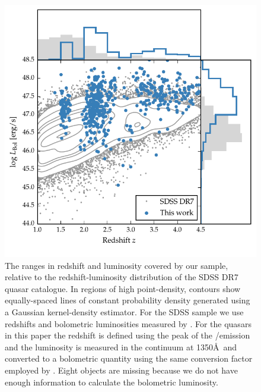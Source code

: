 \begin{figure}
    \includegraphics[width=\textwidth]{figures/chapter02/luminosity_z.pdf} 
    \caption{The ranges in redshift and luminosity covered by our sample, relative to the redshift-luminosity distribution of the SDSS DR7 quasar catalogue. In regions of high point-density, contours show equally-spaced lines of constant probability density generated using a Gaussian kernel-density estimator. For the SDSS sample we use \citet{hewett10} redshifts and bolometric luminosities measured by \citet{shen11}. For the quasars in this paper the redshift is defined using the peak of the \hans/\hb emission and the luminosity is measured in the continuum at 1350\AA\, and converted to a bolometric quantity using the same conversion factor employed by \citet{shen11}. Eight objects are missing because we do not have enough information to calculate the bolometric luminosity.}     
    \label{fig:lzplane}
\end{figure}

